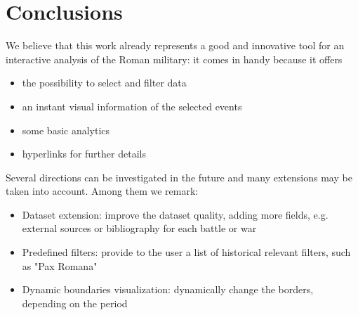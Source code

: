 \section{Conclusions}\label{sec:conclusions}
We believe that this work already represents a good and innovative tool for an interactive analysis of the Roman military: it comes in handy because it offers
\begin{itemize}
    \item the possibility to select and filter data
    \item an instant visual information of the selected events
    \item some basic analytics
    \item hyperlinks for further details
\end{itemize}

Several directions can be investigated in the future and many extensions may be taken into account. Among them we remark:
\begin{itemize}
    \item Dataset extension: improve the dataset quality, adding more fields, e.g. external sources or bibliography for each battle or war
    \item Predefined filters: provide to the user a list of historical relevant filters, such as "Pax Romana"
    \item Dynamic boundaries visualization: dynamically change the borders, depending on the period
\end{itemize}
